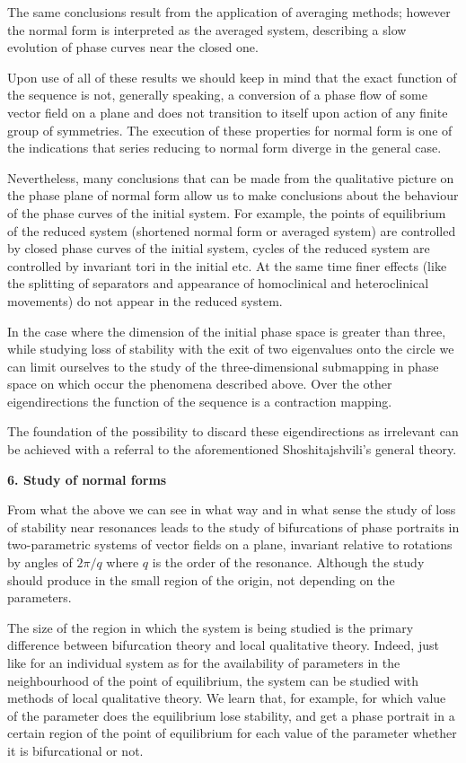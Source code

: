 \documentclass[12pt]{amsart}
\begin{document}
The same conclusions result from the application of averaging methods; however
the normal form is interpreted as the averaged system, describing a slow
evolution of phase curves near the closed one.

Upon use of all of these results we should keep in mind that the exact function
of the sequence is not, generally speaking, a conversion of a phase flow of some
vector field on a plane and does not transition to itself upon action of any
finite group of symmetries.
The execution of these properties for normal form is one of the indications that
series reducing to normal form diverge in the general case.

Nevertheless, many conclusions that can be made from the qualitative picture on
the phase plane of normal form allow us to make conclusions about the behaviour
of the phase curves of the initial system.
For example, the points of equilibrium of the reduced system (shortened normal
form or averaged system) are controlled by closed phase curves of the initial
system, cycles of the reduced system are controlled by invariant tori in the
initial etc.
At the same time finer effects (like the splitting of separators and appearance
of homoclinical and heteroclinical movements) do not appear in the reduced
system.

In the case where the dimension of the initial phase space is greater than
three, while studying loss of stability with the exit of two eigenvalues onto
the circle we can limit ourselves to the study of the three-dimensional
submapping in phase space on which occur the phenomena described above.
Over the other eigendirections the function of the sequence is a contraction
mapping.

The foundation of the possibility to discard these eigendirections as irrelevant
can be achieved with a referral to the aforementioned Shoshitajshvili's general
theory.\\

\centerline{\textbf{6. Study of normal forms}}
\vspace{1em}
From what the above we can see in what way and in what sense the study of loss
of stability near resonances leads to the study of bifurcations of phase
portraits in two-parametric systems of vector fields on a plane, invariant
relative to rotations by angles of $2\pi/q$ where $q$ is the order of the
resonance.
Although the study should produce in the small region of the origin, not
depending on the parameters.

The size of the region in which the system is being studied is the primary
difference between bifurcation theory and local qualitative theory.
Indeed, just like for an individual system as for the availability of parameters
in the neighbourhood of the point of equilibrium, the system can be studied with
methods of local qualitative theory.
We learn that, for example, for which value of the parameter does the
equilibrium lose stability, and get a phase portrait in a certain region of the
point of equilibrium for each value of the parameter whether it is bifurcational
or not.
\end{document}
